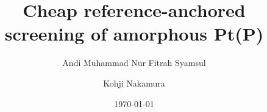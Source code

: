 \documentclass[%
 preprint,
 amsmath,amssymb,
 aps,
]{revtex4-2}
\begin{document}
\title{Cheap reference-anchored screening of amorphous Pt(P)}

\author{Andi Muhammad Nur Fitrah Syamsul}
\author{Kohji Nakamura}

\date{\today}

\begin{abstract}

\end{abstract}

\maketitle







\end{document}
